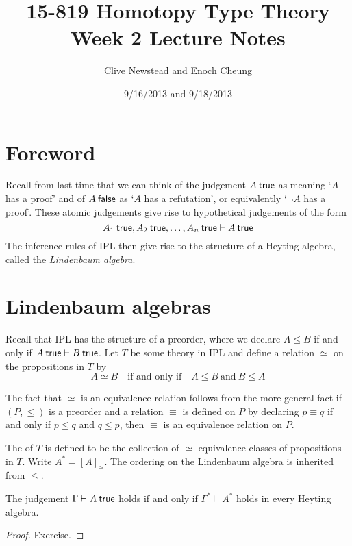 \documentclass[12pt]{article}
\newenvironment{theorem}[1][Theorem.]{\begin{trivlist}\item[\hskip \labelsep {\bfseries #1}]}{\end{trivlist}}
\newenvironment{definition}[1][Definition.]{\begin{trivlist}\item[\hskip \labelsep {\bfseries #1}]}{\end{trivlist}}
\begin{document}
\title{15-819 Homotopy Type Theory\\ Week 2 Lecture Notes}
\author{Clive Newstead and Enoch Cheung}
\date{9/16/2013 and 9/18/2013}

\maketitle

\section*{Foreword}

Recall from last time that we can think of the judgement $A \true$ as meaning `$A$ has a proof' and of $A \postfixjudgment{false}$ as `$A$ has a refutation', or equivalently `$\neg A$ has a proof'. These atomic judgements give rise to hypothetical judgements of the form
$$A_1 \true, A_2 \true, \dots, A_n \true \vdash A \true$$
The inference rules of \acl{IPL} then give rise to the structure of a Heyting algebra, called the \emph{Lindenbaum algebra}.

\section{Lindenbaum algebras}

Recall that \acs{IPL} has the structure of a preorder, where we declare $A \le B$ if and only if $A \true \vdash B \true$. Let $T$ be some theory in \acl{IPL} and define a relation $\simeq$ on the propositions in $T$ by
\begin{equation*}
A \simeq B \quad \text{if and only if} \quad A \le B\ \text{and}\ B \le A
\end{equation*}

The fact that $\simeq$ is an equivalence relation follows from the more general fact if $(P, \le)$ is a preorder and a relation $\equiv$ is defined on $P$ by declaring $p \equiv q$ if and only if $p \le q$ and $q \le p$, then $\equiv$ is an equivalence relation on $P$.

\begin{definition}
The  of $T$ is defined to be the collection of $\simeq$-equivalence classes of propositions in $T$. Write $A^* = [A]_{\simeq}$. The ordering on the Lindenbaum algebra is inherited from $\le$.
\end{definition}

\begin{theorem}
The judgement $\Gamma \vdash A \true$ holds if and only if $\Gamma^* \vdash A^*$ holds in every Heyting algebra.
\end{theorem}
\begin{proof}
Exercise.
\end{proof}
\end{document}
